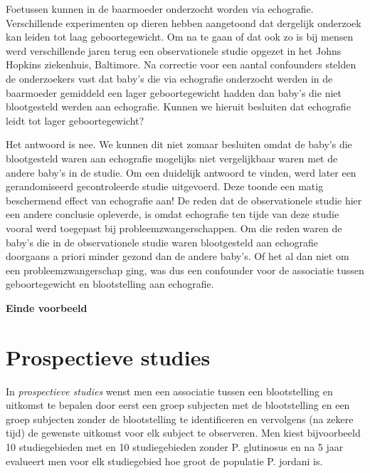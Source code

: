 \documentclass[
  12pt,dutch,coursenotes]{book}
\theoremstyle{definition}
\theoremstyle{definition}
\theoremstyle{definition}
\theoremstyle{definition}
\theoremstyle{remark}
\begin{document}
Foetussen kunnen in de baarmoeder onderzocht worden via
echografie. Verschillende experimenten op dieren hebben aangetoond dat
dergelijk onderzoek kan leiden tot laag geboortegewicht. Om na te gaan of
dat ook zo is bij mensen werd verschillende jaren terug een observationele
studie opgezet in het Johns Hopkins ziekenhuis, Baltimore. Na correctie voor
een aantal confounders stelden de onderzoekers vast dat baby's die via
echografie onderzocht werden in de baarmoeder gemiddeld een lager
geboortegewicht hadden dan baby's die niet blootgesteld werden aan
echografie. Kunnen we hieruit besluiten dat echografie leidt tot lager
geboortegewicht?

Het antwoord is nee. We kunnen dit niet zomaar besluiten omdat de baby's die blootgesteld waren aan echografie mogelijks niet vergelijkbaar waren met de andere baby's in de studie. Om een duidelijk antwoord te vinden, werd later een gerandomiseerd
gecontroleerde studie uitgevoerd. Deze toonde een matig beschermend effect
van echografie aan! De reden dat de observationele studie hier een andere
conclusie opleverde, is omdat echografie ten tijde van deze studie vooral
werd toegepast bij probleemzwangerschappen. Om die reden waren de baby's die
in de observationele studie waren blootgesteld aan echografie doorgaans a
priori minder gezond dan de andere baby's. Of het al dan niet om een
probleemzwangerschap ging, was dus een confounder voor de associatie tussen
geboortegewicht en blootstelling aan echografie.

\textbf{Einde voorbeeld}

\hypertarget{subsec:design:prosp}{%
\section{Prospectieve studies}\label{subsec:design:prosp}}

In \emph{prospectieve studies} wenst men een associatie tussen een
blootstelling en uitkomst te bepalen door eerst een groep subjecten met de
blootstelling en een groep subjecten zonder de blootstelling te
identificeren en vervolgens (na zekere tijd) de gewenste uitkomst voor elk subject
te observeren. Men kiest bijvoorbeeld 10 studiegebieden met en 10 studiegebieden zonder P. glutinosus en na 5 jaar evalueert men voor elk studiegebied hoe groot de populatie P. jordani is.
\end{document}
